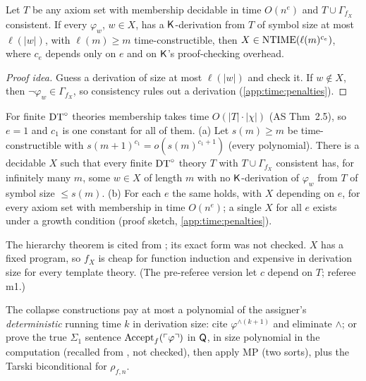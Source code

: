 \begin{theorem}\label{thm:time:ntime}
Let $T$ be any axiom set with membership decidable in time $O(n^e)$ and $T\cup\Gamma_{f_X}$ consistent. If every $\varphi_w$, $w\in X$, has a $\mathsf{K}$-derivation from $T$ of symbol size at most $\ell(|w|)$, with $\ell(m)\ge m$ time-constructible, then $X\in\mathrm{NTIME}(\ell(m)^{c_e})$, where $c_e$ depends only on $e$ and on $\mathsf{K}$'s proof-checking overhead.
\end{theorem}

\begin{proof}[Proof idea]
Guess a derivation of size at most $\ell(|w|)$ and check it. If $w\notin X$, then $\neg\varphi_w\in\Gamma_{f_X}$, so consistency rules out a derivation (\cref{app:time:penalties}).
\end{proof}

\begin{corollary}\label{cor:time:hard}
For finite $\mathrm{DT}^{\circ}$ theories membership takes time $O(|T|\cdot|\chi|)$ (AS Thm~2.5), so $e=1$ and $c_1$ is one constant for all of them.
(a) Let $s(m)\ge m$ be time-constructible with $s(m+1)^{c_1}=o(s(m)^{c_1+1})$ (every polynomial). There is a decidable $X$ such that every finite $\mathrm{DT}^{\circ}$ theory $T$ with $T\cup\Gamma_{f_X}$ consistent has, for infinitely many $m$, some $w\in X$ of length $m$ with no $\mathsf{K}$-derivation of $\varphi_w$ from $T$ of symbol size $\le s(m)$.
(b) For each $e$ the same holds, with $X$ depending on $e$, for every axiom set with membership in time $O(n^e)$; a single $X$ for all $e$ exists under a growth condition (proof sketch, \cref{app:time:penalties}).
\end{corollary}

The hierarchy theorem is cited from \citet{cook1972hierarchy,seiferas1978separating,zak1983turing}; its exact form was not checked. $X$ has a fixed program, so $f_X$ is cheap for function induction and expensive in derivation size for every template theory. (The pre-referee version let $c$ depend on $T$; referee m1.)

\begin{remark}\label{rem:time:upper}
The collapse constructions pay at most a polynomial of the assigner's \emph{deterministic} running time $k$ in derivation size: cite $\varphi^{\wedge(k+1)}$ and eliminate $\wedge$; or prove the true $\Sigma_1$ sentence $\mathrm{Accept}_{f}(\ulcorner \varphi\urcorner)$ in $\mathsf{Q}$, in size polynomial in the computation (recalled from \citealp{pudlak1998lengths}, not checked), then apply MP (two sorts), plus the Tarski biconditional for $\rho_{f,n}$.
\end{remark}

